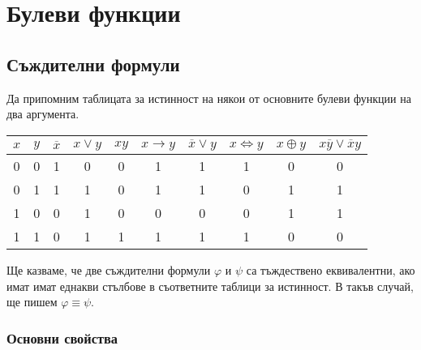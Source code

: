 \chapter{Булеви функции}
\section{Съждителни формули}

Да припомним таблицата за истинност на някои от основните булеви функции на два аргумента.

\vspace{8pt}
\begin{tabular}{|c|c|c|c|c|c|c|c|c|c|}
  \hline
  $x$ & $y$ & $\overline{x}$ & $x \vee y$ & $xy$ & $x \rightarrow y$ & $\overline{x}\vee y$ & $x \iff y$ & $x \oplus y$ & $x\overline{y} \vee \overline{x}y$\\
  \hline
  \hline
  0 & 0 & 1 & 0 & 0 & 1 & 1 & 1 & 0 & 0 \\
  \hline
  0 & 1 & 1 & 1 & 0 & 1 & 1 & 0 & 1 & 1 \\
  \hline
  1 & 0 & 0 & 1 & 0 & 0 & 0 & 0 & 1 & 1 \\
  \hline
  1 & 1 & 0 & 1 & 1 & 1 & 1 & 1 & 0 & 0 \\
  \hline
\end{tabular}
\vspace{8pt}

Ще казваме, че две съждителни формули $\varphi$ и $\psi$ са тъждествено еквивалентни, ако имат имат еднакви стълбове в 
съответните таблици за истинност. В такъв случай, ще пишем $\varphi \equiv \psi$.

\subsection{Основни свойства}


